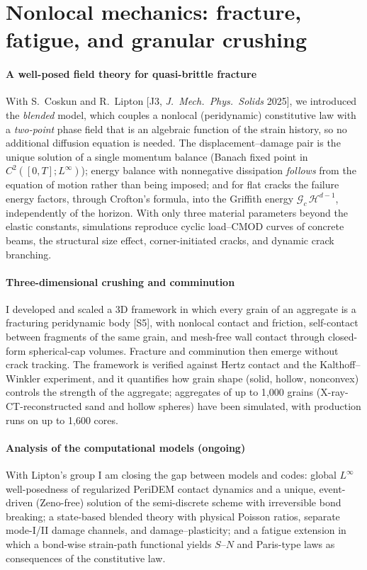 \documentclass[11pt]{article}
\newcommand{\rc}[1]{\textcolor{accent}{[#1]}}
\begin{document}
\section{Nonlocal mechanics: fracture, fatigue, and granular crushing}

\paragraph{A well-posed field theory for quasi-brittle fracture}
With S.~Coskun and R.~Lipton \rc{J3, \emph{J.\ Mech.\ Phys.\ Solids} 2025}, we
introduced the \emph{blended} model, which couples a nonlocal (peridynamic)
constitutive law with a \emph{two-point} phase field that is an algebraic
function of the strain history, so no additional diffusion equation is needed.
The displacement--damage pair is the unique solution of a single momentum
balance (Banach fixed point in $C^2([0,T];L^\infty)$); energy balance with
nonnegative dissipation \emph{follows} from the equation of motion rather than
being imposed; and for flat cracks the failure energy factors, through
Crofton's formula, into the Griffith energy $\mathcal G_c\,\mathcal H^{d-1}$,
independently of the horizon. With only three material parameters beyond the elastic constants,
simulations reproduce cyclic load--CMOD curves of concrete beams, the
structural size effect, corner-initiated cracks, and dynamic crack branching.

\paragraph{Three-dimensional crushing and comminution}
I developed and scaled a 3D framework in which every grain of an aggregate is a
fracturing peridynamic body \rc{S5}, with nonlocal contact and friction,
self-contact between fragments of the same grain, and mesh-free wall contact
through closed-form spherical-cap volumes. Fracture and comminution then emerge
without crack tracking. The framework is verified against Hertz contact and the
Kalthoff--Winkler experiment, and it quantifies how grain shape (solid,
hollow, nonconvex) controls the strength of the aggregate; aggregates of up to
1{,}000 grains (X-ray-CT-reconstructed sand and hollow spheres) have been
simulated, with production runs on up to 1{,}600 cores. %

\paragraph{Analysis of the computational models (ongoing)}
With Lipton's group I am closing the gap between models and codes: %
global $L^\infty$ well-posedness of regularized PeriDEM contact dynamics and a
unique, event-driven (Zeno-free) solution of the semi-discrete scheme with
irreversible bond breaking; a state-based blended theory with physical Poisson
ratios, separate mode-I/II damage channels, and damage--plasticity; and a
fatigue extension in which a bond-wise strain-path functional yields $S$--$N$
and Paris-type laws as consequences of the constitutive law.
\end{document}
